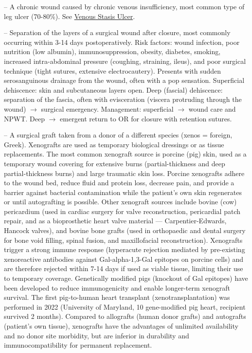 -- A chronic wound caused by chronic venous insufficiency, most common type of leg ulcer (70-80\%). See \hyperlink{Venous Stasis Ulcer}{Venous Stasis Ulcer}.

-- Separation of the layers of a surgical wound after closure, most commonly occurring within 3-14 days postoperatively. Risk factors: wound infection, poor nutrition (low albumin), immunosuppression, obesity, diabetes, smoking, increased intra-abdominal pressure (coughing, straining, ileus), and poor surgical technique (tight sutures, extensive electrocautery). Presents with sudden serosanguinous drainage from the wound, often with a pop sensation. Superficial dehiscence: skin and subcutaneous layers open. Deep (fascial) dehiscence: separation of the fascia, often with evisceration (viscera protruding through the wound) $\rightarrow$ surgical emergency. Management: superficial $\rightarrow$ wound care and NPWT. Deep $\rightarrow$ emergent return to OR for closure with retention sutures.

-- A surgical graft taken from a donor of a different species (xenos = foreign, Greek). Xenografts are used as temporary biological dressings or as tissue replacements. The most common xenograft source is porcine (pig) skin, used as a temporary wound covering for extensive burns (partial-thickness and deep partial-thickness burns) and large traumatic skin loss. Porcine xenografts adhere to the wound bed, reduce fluid and protein loss, decrease pain, and provide a barrier against bacterial contamination while the patient's own skin regenerates or until autografting is possible. Other xenograft sources include bovine (cow) pericardium (used in cardiac surgery for valve reconstruction, pericardial patch repair, and as a bioprosthetic heart valve material — Carpentier-Edwards, Hancock valves), and bovine bone grafts (used in orthopaedic and dental surgery for bone void filling, spinal fusion, and maxillofacial reconstruction). Xenografts trigger a strong immune response (hyperacute rejection mediated by pre-existing xenoreactive antibodies against Gal-alpha-1,3-Gal epitopes on porcine cells) and are therefore rejected within 7-14 days if used as viable tissue, limiting their use to temporary coverage. Genetically modified pigs (knockout of Gal epitopes) have been developed to reduce immunogenicity and enable longer-term xenograft survival. The first pig-to-human heart transplant (xenotransplantation) was performed in 2022 (University of Maryland, 10 gene-modified pig heart, recipient survived 2 months). Compared to allografts (human donor grafts) and autografts (patient's own tissue), xenografts have the advantages of unlimited availability and no donor site morbidity, but are inferior in durability and immunocompatibility for permanent replacement.
